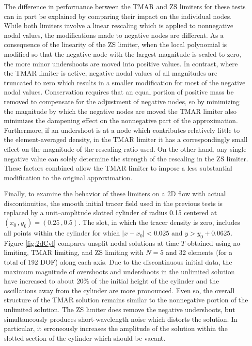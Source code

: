\documentclass{ametsoc}
\begin{document}
The difference in performance between the TMAR and ZS limiters for these tests can in part be explained by comparing their impact on the individual nodes. While both limiters involve a linear rescaling which is applied to nonnegative nodal values, the modifications made to negative nodes are different. As a consequence of the linearity of the ZS limiter, when the local polynomial is modified so that the negative node with the largest magnitude is scaled to zero, the more minor undershoots are moved into positive values. In contrast, where the TMAR limiter is active, negative nodal values of all magnitudes are truncated to zero which results in a smaller modification for most of the negative nodal values. Conservation requires that an equal portion of positive mass be removed to compensate for the adjustment of negative nodes, so by minimizing the magnitude by which the negative nodes are moved the TMAR limiter also minimizes the dampening effect on the nonnegative part of the approximation. Furthermore, if an undershoot is at a node which contributes relatively little to the element-averaged density, in the TMAR limiter it has a correspondingly small effect on the magnitude of the rescaling ratio used. On the other hand, any single negative value can solely determine the strength of the rescaling in the ZS limiter. These factors combined allow the TMAR limiter to impose a less substantial modification to the original approximation. 

Finally, to examine the behavior of these limiters on a 2D flow with actual discontinuities,  the smooth initial tracer field used in the previous tests is replaced by a unit--amplitude slotted cylinder of radius 0.15 centered at $(x_0\, , y_0) = (0.25\,,0.5)$.  The slot, in which the tracer density is zero, includes all points within the cylinder for which $|x-x_0| < 0.025$ and  $y > y_0 + 0.0625$.  Figure \ref{fig:2dCyl} compares unsplit nodal solutions at time $T$ obtained using no limiting, TMAR limiting, and ZS limiting with $N=5$ and $32$ elements (for a total of 192 DOF) along each axis. Due to the discontinuous initial data, the maximum magnitude of overshoots and undershoots in the unlimited solution have increased to about $20\%$ of the initial height of the cylinder and the oscillations away from the cylinder are more pronounced. Even so, the overall structure of the TMAR solution remains similar to the nonnegative portion of the unlimited solution. The ZS limiter does remove the negative undershoots, but simultaneously produces short-wavelength noise which distorts the solution. In particular, it erroneously increases the amplitude of the solution within the slotted section of the cylinder which should be vacant.
\end{document}
